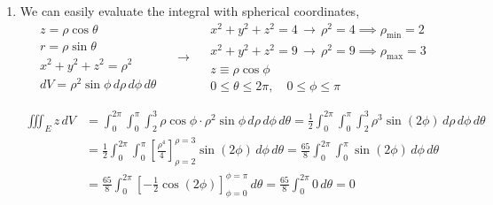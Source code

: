 \documentclass[a4paper, 12pt]{article}
\begin{document}
\begin{enumerate}[leftmargin=*,label=\textbf{\arabic*.}]
\begin{enumerate}[leftmargin=*,label=\textbf{\alph*.}]
Notice that the integral we want to evaluate appears on the right side. After a little algebra, we can evaluate the integral.
\[\int_0^{\arctan2}\sec^3u\,du=\frac12\cdot\tan u\cdot\sec u\,\bigg|_0^{\arctan2}+\frac12\cdot\int_0^{\arctan2}\sec u\,du\]

The integral of $\sec u$ with respect to $u$ is as follows. One can derive it with particular methods.
\[\int_0^{\arctan2}\sec u \, du = \ln\left|\tan u + \sec u\right|\bigg|_0^{\arctan2}\]

So, the surface area becomes as follows.
\begin{align*}S&=\frac12\int_0^{\arctan2}\sec^3u\,du=\frac14\left(\tan u\cdot\sec u+\ln\left|\tan u+\sec u\right|\right)\bigg|_0^{\arctan2}\\[1em]&=\frac14\left[2\sec(\arctan2)+ \ln(2+\sec(\arctan2))-0\right]=\boxed{\frac14\left[2\sqrt5+\ln\left(2+\sqrt5\right)\right]}\end{align*}
\end{enumerate}

\item We can easily evaluate the integral with spherical coordinates,
\[
\begin{array}{c}
z=\rho\cos\theta\\
r=\rho\sin\theta\\
x^2+y^2+z^2=\rho^2\\
dV=\rho^2\sin\phi\,d\rho\,d\phi\,d\theta
\end{array}\quad\rightarrow\quad
\begin{array}{c}
x^2+y^2+z^2=4\,\rightarrow\,\rho^2 = 4\implies \rho_{\text{min}}=2\\
x^2+y^2+z^2=9\,\rightarrow\,\rho^2 = 9\implies \rho_{\text{max}}=3\\
z\equiv\rho\cos\phi\\
0\leq\theta\leq2\pi,\quad0\leq\phi\leq\pi
\end{array}
\]

\begin{align*}
\iiint_Ez\,dV&=\int_0^{2\pi}\int_0^\pi\int_2^3\rho\cos\phi\cdot\rho^2\sin\phi\,d\rho\,d\phi\,d\theta=\frac12\int_0^{2\pi}\int_0^\pi\int_2^3\rho^3\sin(2\phi)\,d\rho\,d\phi\,d\theta\\[1em]&=\frac12\int_0^{2\pi}\int_0^\pi\left[\frac{\rho^4}{4}\right]_{\rho=2}^{\rho=3}\sin(2\phi)\,d\phi\,d\theta=\frac{65}{8}\int_0^{2\pi}\int_0^\pi\sin(2\phi)\,d\phi\,d\theta\\[1em]&=\frac{65}{8}\int_0^{2\pi}\left[-\frac12\cos(2\phi)\right]_{\phi=0}^{\phi=\pi}\,d\theta=\frac{65}{8}\int_0^{2\pi}0\,d\theta =\boxed0
\end{align*}


\end{enumerate}
\end{document}
